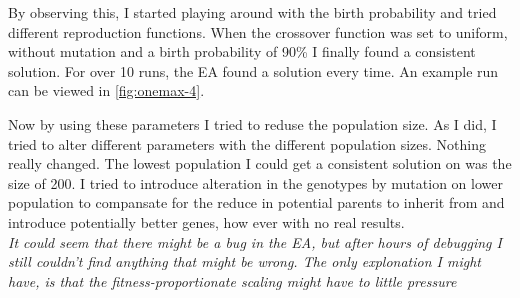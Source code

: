 
By observing this, I started playing around with the birth probability and tried different reproduction functions.
When the crossover function was set to uniform, without mutation and a birth probability of 90\% I finally found
a consistent solution. For over 10 runs, the EA found a solution every time. An example run can be viewed in
\autoref{fig:onemax-4}. 


Now by using these parameters I tried to reduse the population size. As I did, I tried to alter different 
parameters with the different population sizes. Nothing really changed. The lowest population I could get
a consistent solution on was the size of 200. I tried to introduce alteration in the genotypes by mutation
on lower population to compansate for the reduce in potential parents to inherit from and introduce 
potentially better genes, how ever with no real results. \\

\textit{It could seem that there might be a bug in the EA, but after hours of debugging I still couldn't find anything
that might be wrong. The only explonation I might have, is that the fitness-proportionate scaling might have to little
pressure }
